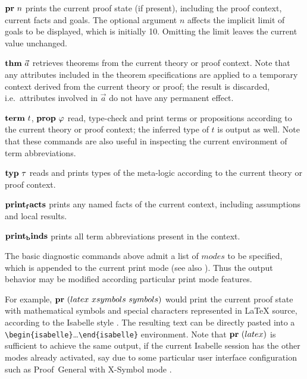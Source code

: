 \begin{descr}
\item [${\mathord{\mathbf{pr}}}~n$] prints the current proof state (if present),
  including the proof context, current facts and goals.  The optional argument
  $n$ affects the implicit limit of goals to be displayed, which is initially
  10.  Omitting the limit leaves the current value unchanged.
\item [${\mathord{\mathbf{thm}}}~\vec a$] retrieves theorems from the current theory
  or proof context.  Note that any attributes included in the theorem
  specifications are applied to a temporary context derived from the current
  theory or proof; the result is discarded, i.e.\ attributes involved in $\vec
  a$ do not have any permanent effect.
\item [${\mathord{\mathbf{term}}}~t$, ${\mathord{\mathbf{prop}}}~\varphi$] read, type-check and
  print terms or propositions according to the current theory or proof
  context; the inferred type of $t$ is output as well.  Note that these
  commands are also useful in inspecting the current environment of term
  abbreviations.
\item [${\mathord{\mathbf{typ}}}~\tau$] reads and prints types of the meta-logic
  according to the current theory or proof context.
\item [${\mathord{\mathbf{print_facts}}}$] prints any named facts of the current
  context, including assumptions and local results.
\item [${\mathord{\mathbf{print_binds}}}$] prints all term abbreviations present in
  the context.
\end{descr}

The basic diagnostic commands above admit a list of $modes$ to be specified,
which is appended to the current print mode (see also \cite{isabelle-ref}).
Thus the output behavior may be modified according particular print mode
features.

For example, ${\mathord{\mathbf{pr}}}~(latex~xsymbols~symbols)$ would print the
current proof state with mathematical symbols and special characters
represented in {\LaTeX} source, according to the Isabelle style
\cite{isabelle-sys}.  The resulting text can be directly pasted into a
\verb,\begin{isabelle},\dots\verb,\end{isabelle}, environment.  Note that
${\mathord{\mathbf{pr}}}~(latex)$ is sufficient to achieve the same output, if the
current Isabelle session has the other modes already activated, say due to
some particular user interface configuration such as Proof~General
\cite{proofgeneral,Aspinall:TACAS:2000} with X-Symbol mode \cite{x-symbol}.


